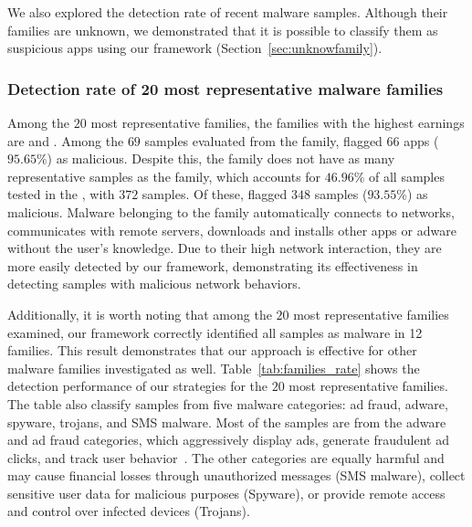 We also explored the detection rate of recent malware samples. Although their families are unknown, we demonstrated that it is possible to classify them as suspicious apps using our framework (Section~\ref{sec:unknowfamily}).


\subsubsection{Detection rate of 20 most representative malware families}\label{sec:familyDetection}


Among the $20$ most representative families, the families with the highest earnings are \gps and \dwg. Among the $69$ samples evaluated from the \dwg family, \droidxpflow flagged $66$ apps ($95.65\%$) as malicious. Despite this, the \dwg family does not have as many representative samples as the \gps family, which accounts for $46.96\%$ of all samples tested in the \fds, with $372$ samples. Of these, \droidxpflow flagged $348$ samples ($93.55$\%) as malicious. Malware belonging to the \gps family automatically connects to networks, communicates with remote servers, downloads and installs other apps or adware without the user’s knowledge\cite{DBLP:journals/jnca/WangCYYPJ19}. Due to their high network interaction, they are more easily detected by our framework, demonstrating its effectiveness in detecting samples with malicious network behaviors.

Additionally, it is worth noting that among the $20$ most representative families examined, our framework correctly identified all samples as malware in 12 families. This result demonstrates that our approach is effective for other malware families investigated as well. Table~\ref{tab:families_rate} shows the detection performance of our strategies for the $20$ most representative families. The table also classify samples from five malware categories: ad fraud, adware, spyware, trojans, and SMS malware. Most of the samples are from the adware and ad fraud categories, which aggressively display ads, generate fraudulent ad clicks, and track user behavior~\cite{DBLP:journals/spe/FallahB22}. The other categories are equally harmful and may cause financial losses through unauthorized messages (SMS malware), collect sensitive user data for malicious purposes (Spyware), or provide remote access and control over infected devices (Trojans).



